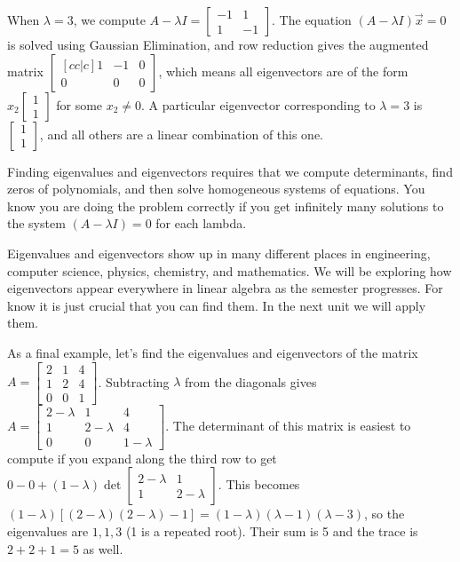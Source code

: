 \documentclass[10pt]{article}
\begin{document}
When {$\lambda=3$}, we compute {$A-\lambda I =\begin{bmatrix} -1&1\\1&-1\end{bmatrix} $}. The equation {$(A-\lambda I )\vec x=0$} is solved using Gaussian Elimination, and row reduction gives the augmented matrix {$\begin{bmatrix}[cc|c] 1&-1&0\\0&0&0\end{bmatrix} $}, which means all eigenvectors are of the form $x_2\begin{bmatrix} 1\\1\end{bmatrix} $  for some {$x_2\neq 0$}. A particular eigenvector corresponding to $\lambda=3$ is $\begin{bmatrix} 1\\1\end{bmatrix} $, and all others are a linear combination of this one.

Finding eigenvalues and eigenvectors requires that we compute determinants, find zeros of polynomials, and then solve homogeneous systems of equations. You know you are doing the problem correctly if you get infinitely many solutions to the system $(A-\lambda I)=0$ for each lambda.

Eigenvalues and eigenvectors show up in many different places in engineering, computer science, physics, chemistry, and mathematics. We will be exploring how eigenvectors appear everywhere in linear algebra as the semester progresses.  For know it is just crucial that you can find them. In the next unit we will apply them.

As a final example, let's find the eigenvalues and eigenvectors of the matrix 
$A=\begin{bmatrix}2&1&4\\ 1&2&4\\ 0&0&1\end{bmatrix}$. 
Subtracting $\lambda$ from the diagonals gives 
$A=\begin{bmatrix}2-\lambda&1&4\\ 1&2-\lambda&4\\ 0&0&1-\lambda\end{bmatrix}$. The determinant of this matrix is easiest to compute if you expand along the third row to get $0 - 0 + (1-\lambda) \det\begin{bmatrix} 2-\lambda&1\\1&2-\lambda\end{bmatrix}$. This becomes $(1-\lambda)[(2-\lambda)(2-\lambda)-1] = (1-\lambda)(\lambda-1)(\lambda-3)$,  so the eigenvalues are $1,1,3$ (1 is a repeated root). Their sum is 5 and the trace is $2+2+1=5$ as well.
\end{document}
